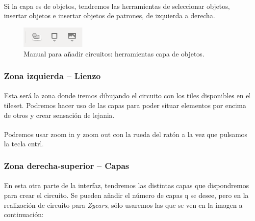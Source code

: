 \paragraph{}
Si la capa es de objetos, tendremos las herramientas de seleccionar objetos, insertar objetos e insertar objetos de patrones,
de izquierda a derecha.

\begin{figure}[H]
  \label{herramientas_objetos}
  \begin{center}
    \includegraphics[scale=1]{imagenes/manualcircuito/herramientas_objetos.png}
  \end{center}
  \caption{Manual para añadir circuitos: herramientas capa de objetos.}
\end{figure}

\subsubsection{Zona izquierda -- Lienzo}

\paragraph{}
Esta será la zona donde iremos dibujando el circuito con los tiles disponibles en el tileset. Podremos hacer uso de las capas
para poder situar elementos por encima de otros y crear sensación de lejania.

\paragraph{}
Podremos usar zoom in y zoom out con la rueda del ratón a la vez que pulsamos la tecla cntrl.

\subsubsection{Zona derecha-superior -- Capas}

\paragraph{}
En esta otra parte de la interfaz, tendremos las distintas capas que dispondremos para crear el circuito. Se pueden añadir
el número de capas q se desee, pero en la realización de circuito para \emph{Zycars}, sólo usaremos las que se ven en la imagen 
a continuación:

